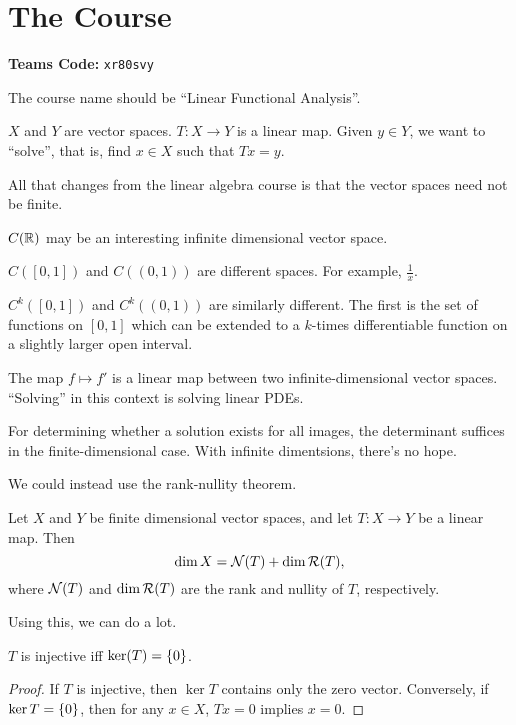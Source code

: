 \chapter*{The Course}

\textbf{Teams Code:} \texttt{xr80svy}

The course name should be ``Linear Functional Analysis''.
\begin{center}
    $X$ and $Y$ are vector spaces.
    $T\colon X \to Y$ is a linear map.
    Given $y \in Y$, we want to ``solve'', that is, find $x \in X$ such that
    $Tx = y$.
\end{center}
All that changes from the linear algebra course is that the vector spaces
need not be finite.

\begin{examples}
    \item $C(\mathbb{R})$ may be an interesting infinite dimensional vector space.
    \item $C([0, 1])$ and $C((0, 1))$ are different spaces.
        For example, $\frac1x$.
    \item $C^k([0, 1])$ and $C^k((0, 1))$ are similarly different.
        The first is the set of functions on $[0, 1]$ which can be extended
        to a $k$-times differentiable function on a slightly larger open
        interval.
\end{examples}
The map $f \mapsto f'$ is a linear map between two infinite-dimensional
vector spaces.
``Solving'' in this context is solving linear PDEs.

For determining whether a solution exists for all images, the determinant
suffices in the finite-dimensional case.
With infinite dimentsions, there's no hope.

We could instead use the rank-nullity theorem.
\begin{theorem} \label{thm:rank-nullity}
    Let $X$ and $Y$ be finite dimensional vector spaces,
    and let $T\colon X \to Y$ be a linear map.
    Then \[
        \operatorname{dim} X = \mathcal{N}(T) + \operatorname{dim} \mathcal{R}(T),
    \] where $\mathcal{N}(T)$ and $\operatorname{dim} \mathcal{R}(T)$ are the rank and nullity of $T$,
    respectively.
\end{theorem}
Using this, we can do a lot.

\begin{lemma}
    $T$ is injective iff $\ker(T) = \{0\}$.
\end{lemma}
\begin{proof}
    If $T$ is injective, then $\ker T$ contains only the zero vector.
    Conversely, if $\ker T = \{0\}$, then for any $x \in X$,
    $Tx = 0$ implies $x = 0$.
\end{proof}

